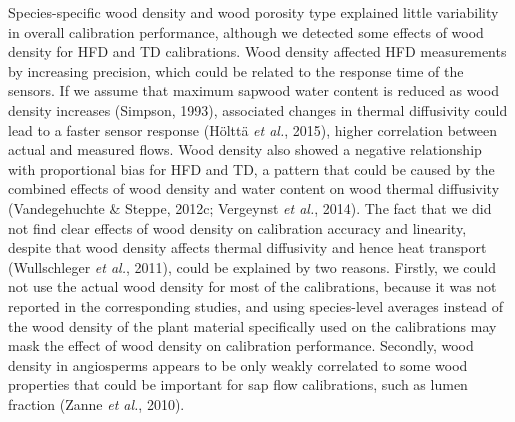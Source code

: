 \documentclass[11pt,twoside]{reedthesis}
\begin{document}
Species-specific wood density and wood porosity type explained little
variability in overall calibration performance, although we detected
some effects of wood density for HFD and TD calibrations. Wood density
affected HFD measurements by increasing precision, which could be
related to the response time of the sensors. If we assume that maximum
sapwood water content is reduced as wood density increases (Simpson,
1993), associated changes in thermal diffusivity could lead to a faster
sensor response (Hölttä \emph{et al.}, 2015), higher correlation between
actual and measured flows. Wood density also showed a negative
relationship with proportional bias for HFD and TD, a pattern that could
be caused by the combined effects of wood density and water content on
wood thermal diffusivity (Vandegehuchte \& Steppe, 2012c; Vergeynst
\emph{et al.}, 2014). The fact that we did not find clear effects of
wood density on calibration accuracy and linearity, despite that wood
density affects thermal diffusivity and hence heat transport
(Wullschleger \emph{et al.}, 2011), could be explained by two reasons.
Firstly, we could not use the actual wood density for most of the
calibrations, because it was not reported in the corresponding studies,
and using species-level averages instead of the wood density of the
plant material specifically used on the calibrations may mask the effect
of wood density on calibration performance. Secondly, wood density in
angiosperms appears to be only weakly correlated to some wood properties
that could be important for sap flow calibrations, such as lumen
fraction (Zanne \emph{et al.}, 2010).\par
\end{document}
